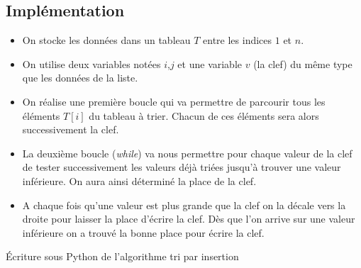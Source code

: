 \subsection{Implémentation}

\begin{algorithm}
\DontPrintSemicolon
{}
\end{algorithm}


\begin{itemize}
\item On stocke les données dans un tableau $T$ entre les indices $1$ et $n$.
\item On utilise deux variables notées $i$,$j$ et une variable $v$ (la clef) du même type que les données de la liste.
\item On réalise une première boucle qui va permettre de parcourir tous les éléments $T[i]$ du tableau à trier.
Chacun de ces éléments sera alors successivement la clef.
\item La deuxième boucle (\textit{while}) va nous permettre pour chaque valeur de la clef de tester successivement les valeurs déjà triées jusqu'à trouver une valeur inférieure. On aura ainsi déterminé la place de la clef.
\item A chaque fois qu'une valeur est plus grande que la clef on la décale vers la droite pour laisser la place d'écrire la clef.
Dès que l'on arrive sur une valeur inférieure on a trouvé la bonne place pour écrire la clef.
\end{itemize}


\begin{algorithme}{Écriture sous Python de l'algorithme tri par insertion}
\ifprof
\begin{center}
		
\end{center}
\fi
\end{algorithme}

